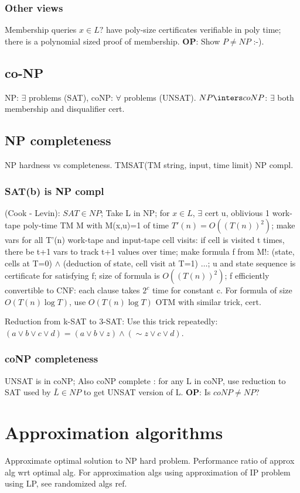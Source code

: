 \documentclass[oneside, article]{memoir}
\begin{document}
\subsubsection{Other views}
Membership queries $x \in L ?$ have poly-size certificates verifiable in poly time; there is a polynomial sized proof of membership. \textbf{OP}: Show $P \neq NP$ :-).

\subsection{co-NP}
NP: $\exists$ problems (SAT), coNP: $\forall$ problems (UNSAT). $NP \inters coNP$: $\exists$ both membership and disqualifier cert.

\subsection{NP completeness}
NP hardness vs completeness. TMSAT(TM string, input, time limit) NP compl.

\subsubsection{SAT(b) is NP compl}
(Cook - Levin): $SAT \in NP$; Take L in NP; for $x \in L$, $\exists$ cert u, oblivious 1 work-tape poly-time TM M with M(x,u)=1 of time $T'(n) = O((T(n))^{2})$; make vars for all T'(n) work-tape and input-tape cell visits: if cell is visited t times, there be t+1 vars to track t+1 values over time; make formula f from M!: (state, cells at T=0) $\land$ (deduction of state, cell visit at T=1) $\dots$; u and state sequence is certificate for satisfying f; size of formula is $O((T(n))^{2})$; f efficiently convertible to CNF: each clause takes $2^{c}$ time for constant c. For formula of size $O(T(n)\log T)$, use $O(T(n)\log T)$ OTM with similar trick, cert.

Reduction from k-SAT to 3-SAT: Use this trick repeatedly: $(a \lor b \lor c \lor d) = (a \lor b \lor z) \land (\sim z \lor c \lor d)$.

\subsubsection{coNP completeness}
UNSAT is in coNP; Also coNP complete : for any L in coNP, use reduction to SAT used by $\bar{L} \in NP$ to get UNSAT version of L. \textbf{OP}: Is $coNP \neq NP$?

\section{Approximation algorithms}
Approximate optimal solution to NP hard problem. Performance ratio of approx alg wrt optimal alg. For approximation algs using approximation of IP problem using LP, see randomized algs ref.
\end{document}
